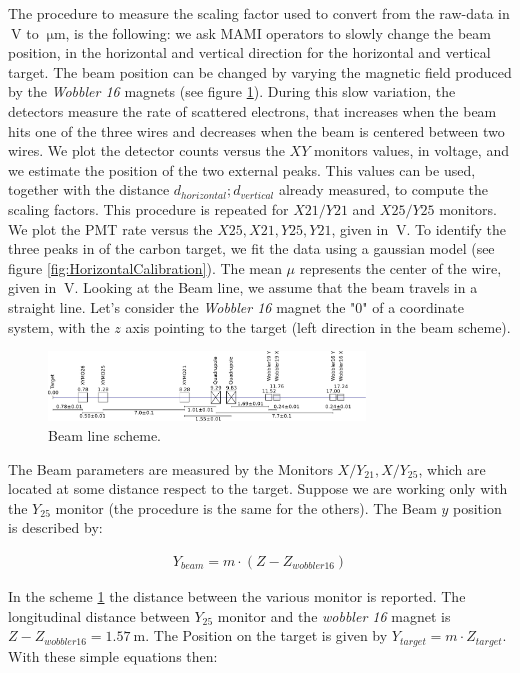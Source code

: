 The procedure to measure the scaling factor used to convert from the raw-data in $\SI{}{\volt}$ to $\SI{}{\micro \meter}$, is the following: we ask MAMI operators to slowly change the beam position, in the horizontal and vertical direction for the horizontal and vertical target. The beam position can be changed by varying the magnetic field produced by the \textit{Wobbler 16} magnets (see figure \ref{fig:BeamLine}). 
During this slow variation, the detectors measure the rate of scattered electrons, that increases when the beam hits one of the three wires and decreases when the beam is centered between two wires. We plot the detector counts versus the $XY$ monitors values, in voltage, and we estimate the position of the two external peaks. This values can be used, together with the distance $d_{horizontal};d_{vertical}$ already measured, to compute the scaling factors. This procedure is repeated for $X21/Y21$ and $X25/Y25$ monitors. We plot the PMT rate versus the $X25,X21,Y25,Y21$, given in $\SI{}{\volt}$. 
To identify the three peaks in of the carbon target, we fit the data using a gaussian model (see figure \ref{fig:HorizontalCalibration}). The mean $\mu$ represents the center of the wire, given in $\SI{}{\volt}$.
\newpage
Looking at the Beam line, we assume that the beam travels in a straight line. Let's consider the \textit{Wobbler 16} magnet the "$0$" of a coordinate system, with the $z$ axis pointing to the target (left direction in the beam scheme).
\begin{figure}[hbtp]
\centering
\includegraphics[width = 0.75\textwidth]{figures/XYMOCalibBeamLine.pdf}
\caption{Beam line scheme.}
\label{fig:BeamLine}
\end{figure} 

The Beam parameters are measured by the Monitors $X/Y_{21}, X/Y_{25}$, which are located at some distance respect to the target. Suppose we are working only with the $Y_{25}$ monitor (the procedure is the same for the others). The Beam $y$ position is described by:

\begin{align*}
Y_{beam} = m \cdot (Z - Z_{wobbler 16})
\end{align*}

In the scheme \ref{fig:BeamLine} the distance between the various monitor is reported. The longitudinal distance between $Y_{25}$ monitor and the \textit{wobbler 16} magnet is $Z - Z_{wobbler16} = \SI{1.57}{\meter}$. The Position on the target is given by $Y_{target} = m \cdot Z_{target}$. With these simple equations then:

